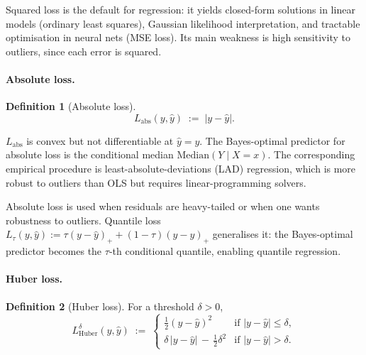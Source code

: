 \documentclass[11pt]{article}
\theoremstyle{definition}
\newtheorem{definition}{Definition}
\begin{document}
\begin{mlnote}
Squared loss is the default for regression: it yields closed-form solutions
in linear models (ordinary least squares), Gaussian likelihood
interpretation, and tractable optimisation in neural nets (MSE loss).
Its main weakness is high sensitivity to outliers, since each error is
squared.
\end{mlnote}

\paragraph{Absolute loss.}

\begin{definition}[Absolute loss]
\[
  L_{\mathrm{abs}}(y, \hat y) \;:=\; |y - \hat y|.
\]
\end{definition}

\begin{mathnote}
$L_{\mathrm{abs}}$ is convex but not differentiable at $\hat y = y$. The
Bayes-optimal predictor for absolute loss is the conditional median
$\mathrm{Median}(Y \mid X = x)$. The corresponding empirical procedure is
least-absolute-deviations (LAD) regression, which is more robust to outliers
than OLS but requires linear-programming solvers.
\end{mathnote}

\begin{mlnote}
Absolute loss is used when residuals are heavy-tailed or when one wants
robustness to outliers. Quantile loss
$L_\tau(y, \hat y) := \tau (y - \hat y)_+ + (1 - \tau)(\hat y - y)_+$
generalises it: the Bayes-optimal predictor becomes the $\tau$-th conditional
quantile, enabling quantile regression.
\end{mlnote}

\paragraph{Huber loss.}

\begin{definition}[Huber loss]
For a threshold $\delta > 0$,
\[
  L_{\mathrm{Huber}}^{\delta}(y, \hat y) \;:=\;
  \begin{cases}
    \tfrac{1}{2}(y - \hat y)^{2} & \text{if } |y - \hat y| \leq \delta, \\[2pt]
    \delta\,|y - \hat y| \,-\, \tfrac{1}{2}\delta^{2} & \text{if } |y - \hat y| > \delta.
  \end{cases}
\]
\end{definition}
\end{document}
